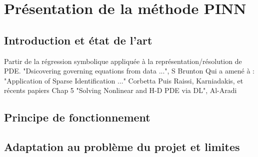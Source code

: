 \section{Présentation de la méthode PINN}

\subsection{Introduction et état de l'art}

Partir de la régression symbolique appliquée à la représentation/résolution de PDE.
"Dsicovering governing equations from data ...", S Brunton
Qui a amené à :
"Application of Sparse Identification ..." Corbetta
Puis Raissi, Karniadakis, et récents papiers
Chap 5 "Solving Nonlinear and H-D PDE via DL", Al-Aradi
\subsection{Principe de fonctionnement}

\subsection{Adaptation au problème du projet et limites}

